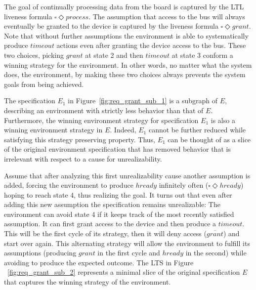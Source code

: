 The goal of continually processing data from the board is captured
by the LTL liveness formula $\square\Diamond process$.  The assumption
that access to the bus will always eventually be granted to the device
is captured by the liveness formula $\square\Diamond grant$.
 Note that without further assumptions the environment is able to
 systematically produce $timeout$ actions even after granting the device access
 to the bus.  These two choices, picking $grant$ at state 2 and then
 $timeout$ at state 3 conform a winning strategy for the environment. In other
 words, no matter what the system does, the environment, by making these two
 choices always prevents the system goals from being achieved.
 
The  specification $E_{1}$ in Figure~\ref{fig:req_grant_sub_1} is a subgraph of $E$, describing an environment with strictly less behavior than that of $E$. Furthermore, the winning environment strategy for specification $E_1$ is also a winning environment strategy in $E$. Indeed,  $E_1$ cannot be further reduced while satisfying this strategy preserving property. Thus, $E_1$ can be thought of as a slice of the original environment specification that has removed behavior that is irrelevant with respect to a cause for unrealizability.

Assume that after analyzing this first unrealizability cause another assumption is added, forcing the environment to produce
$hready$ infinitely often ($\square\Diamond hready$) hoping to reach state 4,
thus realizing the goal.  It turns out that even after adding this
new assumption the specification remains unrealizable:  The environment
can avoid state 4 if it keeps track of the most recently satisfied assumption.
It can first grant access to the device and then produce a $timeout$. 
This will be the first cycle of its strategy, then it will deny access
 ($\overline{grant}$) and start over again.  This alternating strategy will allow the environment
 to fulfill its assumptions (producing $grant$ in the first cycle
 and $hready$ in the second) while avoiding to produce the expected
 outcome.  The LTS in Figure
 ~\ref{fig:req_grant_sub_2} represents a minimal slice of the original specification $E$ that captures the winning strategy of the environment. 
 
 

 
